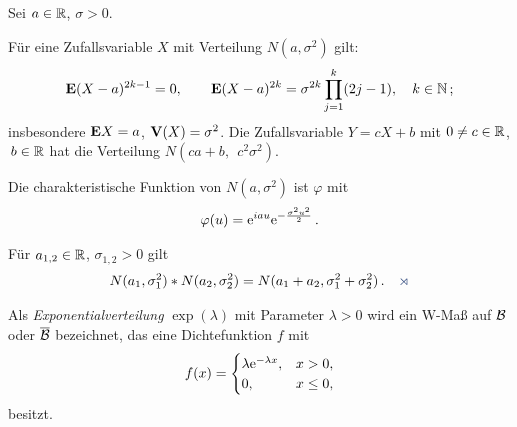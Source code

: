 \begin{prop}
\label{prop:7.5}
 Sei $a \in \mathbb{R}$, $\sigma > 0$.
\begin{propenum}
\item Für eine Zufallsvariable $X$ mit Verteilung $N(a,\sigma ^ {2})$ gilt:
\begin{align*}
\textbf{E}(X-a)^ {2k-1} = 0,\qquad \textbf{E}(X-a)^ {2k} =\sigma ^ {2k} \prod
\limits^ {k}_{j=1} (2j-1), \quad k\in \mathbb{N}\, ;
\end{align*}
insbesondere $\textbf{E} X =a$, $\textbf{V}(X) = \sigma ^ {2}$. Die Zufallsvariable $Y=cX+b$ mit
$ 0 \neq c\in \mathbb{R}$, $\, b\in \mathbb{R}$ hat die Verteilung $N(ca+b,\,\; c^ {2} \sigma
^{2})$.
\item
Die charakteristische Funktion von $N(a,\sigma ^ {2})$ ist $\varphi $ mit
\begin{align*}
\varphi (u) = \mathrm{e}^ {iau} \mathrm{e}^ {-\frac{\sigma ^ {2} u^ {2}}{2}}\, .
\end{align*}
\item
Für $a_{1,2} \in \mathbb{R}$, $\sigma _{1,2} >0$ gilt
\begin{align*}
N(a_{1}, \sigma ^ {2}_{1}) \ast N(a_{2},\sigma ^ {2}_{2}) = N (a_{1} +a_{2},
\sigma ^ {2}_{1} +\sigma ^ {2}_{2})\, .\fishhere
\end{align*}
\end{propenum}
\end{prop}

\begin{defn}
\label{defn:7.7}
Als \emph{Exponentialverteilung} $\exp (\lambda)$ mit
Parameter $\lambda >0$ wird ein W-Maß auf ${\mathcal{B}}$ oder $\overline{\mathcal{B}}$
bezeichnet, das eine Dichtefunktion $f$ mit
\begin{align*}
f(x)=
\begin{cases}
\lambda \mathrm{e}^ {-\lambda x}, & x>0,\\
0, & x\leq 0,
\end{cases}
\end{align*}
besitzt.\fishhere
\end{defn}

